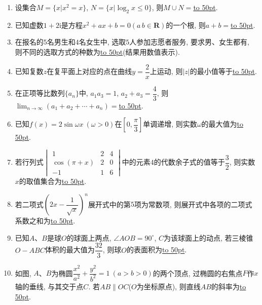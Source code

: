 \documentclass[10pt,a4paper]{article}
\newcommand{\blank}[1]{\underline{\hbox to #1pt{}}}
\begin{document}
\begin{enumerate}[1.]
\item 设集合$M=\{x|x^2=x\}$, $N=\{x|\log_2 x\le 0\}$, 则$M\cup N=$\blank{50}.
\item 已知虚数$1+2\mathrm{i}$是方程$x^2+ax+b=0 (a\,b\in \mathbf{R})$的一个根, 则$a+b=$\blank{50}.
\item 在报名的$5$名男生和$4$名女生中, 选取$5$人参加志愿者服务, 要求男、女生都有, 则不同的选取方式的种数为\blank{50}(结果用数值表示).
\item 已知复数$z$在复平面上对应的点在曲线$y=\dfrac 2 x$上运动, 则$|z|$的最小值等于\blank{50}.
\item 在正项等比数列$\{a_n\}$中, $a_1a_3=1$, $a_2+a_3=\dfrac43$, 则$\displaystyle\lim_{n\to\infty}(a_1+a_2+\cdots +a_n)=$\blank{50}.
\item 已知$f(x)=2 \sin \omega x\ (\omega >0)$在$[0,\dfrac\pi 3]$单调递增, 则实数$\omega$的最大值为\blank{50}.
\item 若行列式$\begin{vmatrix}   1 & 2 & 4 \\   \cos (\pi +x) & 2 & 0 \\   -1 & 1 & 6 \end{vmatrix}$中的元素$4$的代数余子式的值等于$\dfrac32$, 则实数$x$的取值集合为\blank{50}.
\item 若二项式$(2x-\dfrac1{\sqrt x})^n$展开式中的第$5$项为常数项, 则展开式中各项的二项式系数之和为\blank{50}.
\item 已知$A$、$B$是球$O$的球面上两点, $\angle AOB=90^\circ$, $C$为该球面上的动点, 若三棱锥$O-ABC$体积的最大值为$\dfrac{32}{3}$, 则球$O$的表面积为\blank{50}.
\begin{center}
\end{center}
\item 如图, $A$、$B$为椭圆$\dfrac{x^2}{a^2}+\dfrac{y^2}{b^2}=1 \ (a>b>0)$的两个顶点, 过椭圆的右焦点$F$作$x$轴的垂线, 与其交于点$C$. 若$AB\parallel OC$($O$为坐标原点), 则直线$AB$的斜率为\blank{50}.
\begin{center}

\end{center}
\end{enumerate}
\end{document}
